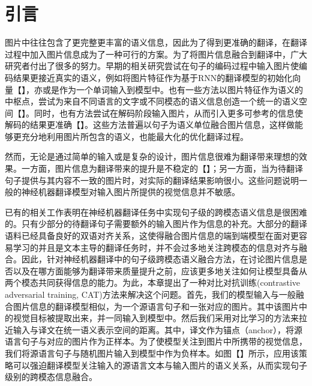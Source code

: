 \section{引言}
图片中往往包含了更完整更丰富的语义信息，因此为了得到更准确的翻译，在翻译过程中加入图片信息成为了一种可行的方案。为了将图片信息融合到翻译中，广大研究者付出了很多的努力。早期的相关研究尝试在句子的编码过程中输入图片使编码结果更接近真实的语义，例如将图片特征作为基于RNN的翻译模型的初始化向量【】，亦或是作为一个单词输入到模型中。也有一些方法以图片特征作为语义的中枢点，尝试为来自不同语言的文字或不同模态的语义信息创造一个统一的语义空间【】。同时，也有方法尝试在解码阶段输入图片，从而引入更多可参考的信息使解码的结果更准确【】。这些方法普遍以句子为语义单位融合图片信息，这样做能够更充分地利用图片所包含的语义，也能最大化的优化翻译过程。

然而，无论是通过简单的输入或是复杂的设计，图片信息很难为翻译带来理想的效果。一方面，图片信息为翻译带来的提升是不稳定的【】；另一方面，当为待翻译句子提供与其内容不一致的图片时，对实际的翻译结果影响很小。这些问题说明一般的神经机器翻译模型对输入图片所提供的视觉信息并不敏感。

已有的相关工作表明在神经机器翻译任务中实现句子级的跨模态语义信息是很困难的。只有少部分的待翻译句子需要额外的输入图片作为信息的补充。大部分的翻译语料已经具备良好的双语对齐关系，这使得融合图片信息的端到端模型在面对更容易学习的并且是文本主导的翻译任务时，并不会过多地关注跨模态的信息对齐与融合。因此，针对神经机器翻译中的句子级跨模态语义融合方法，在讨论图片信息是否以及在哪方面能够为翻译带来质量提升之前，应该更多地关注如何让模型具备从两个模态共同获得信息的能力。为此，本章提出了一种对比对抗训练(contrastive adversarial training, CAT)方法来解决这个问题。首先，我们的模型输入与一般融合图片信息的翻译模型相似，为一个源语言句子和一张对应的图片。其中该图片中的视觉目标被提取出来，并一同输入到模型中。然后我们采用对比学习的方法来拉近输入与译文在统一语义表示空间的距离。其中，译文作为锚点（anchor），将源语言句子与对应的图片作为正样本。为了使模型关注到图片中所携带的视觉信息，我们将源语言句子与随机图片输入到模型中作为负样本。如图【】所示，应用该策略可以强迫翻译模型关注输入的源语言文本与输入图片的语义关系，从而实现句子级别的跨模态信息融合。

